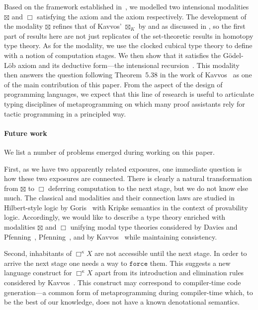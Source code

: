\documentclass[a4paper,UKenglish,numberwithinsect,cleveref,thm-restate]{lipics-v2021}
\numberwithin{equation}{section}
\theoremstyle{plain}
\begin{document}
Based on the framework established in~, we modelled two intensional modalities $\boxtimes$ and $\Box$ satisfying the \SFour axiom and the \GL axiom respectively.
The development of the \SFour modality $\boxtimes$ refines that of Kavvos' $\boxtimes_K$ by  and as discussed in , so the first part of results here are not just replicates of the set-theoretic results in homotopy type theory. 
As for the \GL modality, we use the clocked cubical type theory to define with a notion of computation stages.
We then show that it satisfies the Gödel-Löb axiom and its deductive form---the intensional recursion~\cite{Kavvos2017b}.
This \GL modality then answers the question following Theorem~5.38 in the work of Kavvos~\cite{Kavvos2020} as one of the main contribution of this paper.
From the aspect of the design of programming languages, we expect that this line of research is useful to articulate typing disciplines of metaprogramming on which many proof assistants rely for tactic programming in a principled way.

\paragraph*{Future work}
We list a number of problems emerged during working on this paper.

First, as we have two apparently related exposures, one immediate question is how these two exposures are connected.  There is clearly a natural transformation from $\boxtimes$ to $\Box$ deferring computation to the next stage, but we do not know else much.
The classical \SFour and \GL modalities and their connection laws are studied in Hilbert-style logic by Goris~\cite{Goris2009} with Kripke semantics in the context of provability logic.
Accordingly, we would like to describe a type theory enriched with modalities $\boxtimes$ and $\Box$ unifying modal type theories considered by Davies and Pfenning~\cite{Davies2001b}, Pfenning~\cite{Pfenning2002a}, and by Kavvos~\cite{Kavvos2017b,Kavvos2020} while maintaining consistency.

Second, inhabitants of $\Box^\kappa X$ are not accessible until the next stage. In order to arrive the next stage one needs a way to $\mathtt{force}$ them. 
This suggests a new language construct for $\Box^\kappa X$ apart from its introduction and elimination rules considered by Kavvos~\cite{Kavvos2017a}.
This construct may correspond to compiler-time code generation---a common form of metaprogramming during compiler-time which, to be the best of our knowledge, does not have a known denotational semantics.
\end{document}
